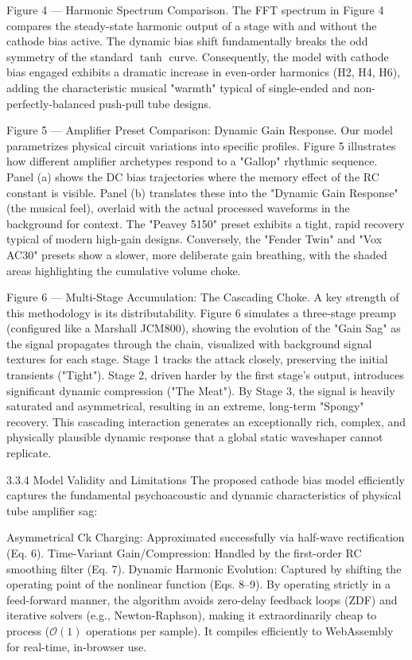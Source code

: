 Figure 4 — Harmonic Spectrum Comparison. The FFT spectrum in Figure 4 compares the steady-state harmonic output of a stage with and without the cathode bias active. The dynamic bias shift fundamentally breaks the odd symmetry of the standard $\tanh$ curve. Consequently, the model with cathode bias engaged exhibits a dramatic increase in even-order harmonics (H2, H4, H6), adding the characteristic musical "warmth" typical of single-ended and non-perfectly-balanced push-pull tube designs.

Figure 5 --- Amplifier Preset Comparison: Dynamic Gain Response. Our model parametrizes physical circuit variations into specific profiles. Figure 5 illustrates how different amplifier archetypes respond to a "Gallop" rhythmic sequence. Panel (a) shows the DC bias trajectories where the memory effect of the RC constant is visible. Panel (b) translates these into the "Dynamic Gain Response" (the musical feel), overlaid with the actual processed waveforms in the background for context. The "Peavey 5150" preset exhibits a tight, rapid recovery typical of modern high-gain designs. Conversely, the "Fender Twin" and "Vox AC30" presets show a slower, more deliberate gain breathing, with the shaded areas highlighting the cumulative volume choke.

Figure 6 --- Multi-Stage Accumulation: The Cascading Choke. A key strength of this methodology is its distributability. Figure 6 simulates a three-stage preamp (configured like a Marshall JCM800), showing the evolution of the "Gain Sag" as the signal propagates through the chain, visualized with background signal textures for each stage. Stage 1 tracks the attack closely, preserving the initial transients ("Tight"). Stage 2, driven harder by the first stage's output, introduces significant dynamic compression ("The Meat"). By Stage 3, the signal is heavily saturated and asymmetrical, resulting in an extreme, long-term "Spongy" recovery. This cascading interaction generates an exceptionally rich, complex, and physically plausible dynamic response that a global static waveshaper cannot replicate.

3.3.4 Model Validity and Limitations
The proposed cathode bias model efficiently captures the fundamental psychoacoustic and dynamic characteristics of physical tube amplifier sag:

Asymmetrical Ck Charging: Approximated successfully via half-wave rectification (Eq. 6).
Time-Variant Gain/Compression: Handled by the first-order RC smoothing filter (Eq. 7).
Dynamic Harmonic Evolution: Captured by shifting the operating point of the nonlinear function (Eqs. 8–9).
By operating strictly in a feed-forward manner, the algorithm avoids zero-delay feedback loops (ZDF) and iterative solvers (e.g., Newton-Raphson), making it extraordinarily cheap to process ($\mathcal{O}(1)$ operations per sample). It compiles efficiently to WebAssembly for real-time, in-browser use.

